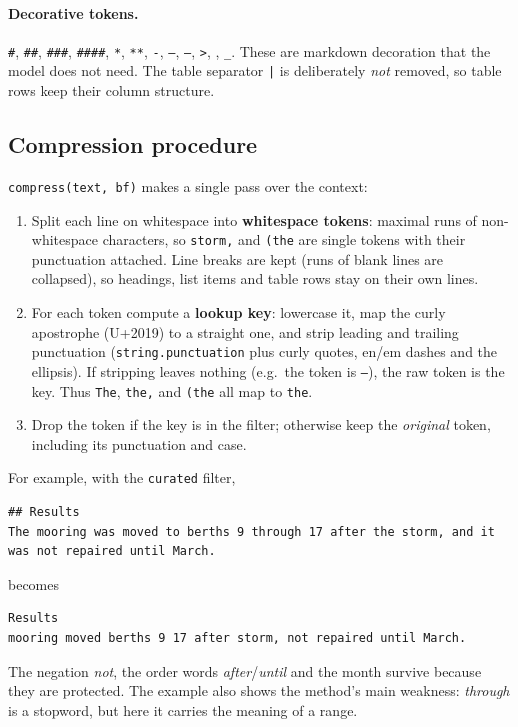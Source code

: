 \documentclass[11pt]{article}
\newcommand{\code}[1]{\texttt{#1}}
\begin{document}
\paragraph{Decorative tokens.} \code{\#}, \code{\#\#}, \code{\#\#\#}, \code{\#\#\#\#}, \code{*},
\code{**}, \code{-}, \code{--}, \code{---}, \code{>}, \code{\textbullet}, \code{\_}. These are
markdown decoration that the model does not need. The table separator \code{|} is deliberately
\emph{not} removed, so table rows keep their column structure.

\subsection{Compression procedure}
\code{compress(text, bf)} makes a single pass over the context:
\begin{enumerate}
  \item Split each line on whitespace into \textbf{whitespace tokens}: maximal runs of
        non-whitespace characters, so \code{storm,} and \code{(the} are single tokens with their
        punctuation attached. Line breaks are kept (runs of blank lines are collapsed), so
        headings, list items and table rows stay on their own lines.
  \item For each token compute a \textbf{lookup key}: lowercase it, map the curly apostrophe
        (U+2019) to a straight one, and strip leading and trailing punctuation (\code{string.punctuation}
        plus curly quotes, en/em dashes and the ellipsis). If stripping leaves nothing (e.g.\ the
        token is \code{---}), the raw token is the key. Thus \code{The}, \code{the,} and \code{(the}
        all map to \code{the}.
  \item Drop the token if the key is in the filter; otherwise keep the \emph{original} token,
        including its punctuation and case.
\end{enumerate}
For example, with the \code{curated} filter,
\begin{lstlisting}
## Results
The mooring was moved to berths 9 through 17 after the storm, and it was not repaired until March.
\end{lstlisting}
becomes
\begin{lstlisting}
Results
mooring moved berths 9 17 after storm, not repaired until March.
\end{lstlisting}
The negation \emph{not}, the order words \emph{after}/\emph{until} and the month survive because
they are protected. The example also shows the method's main weakness: \emph{through} is a
stopword, but here it carries the meaning of a range.
\end{document}
